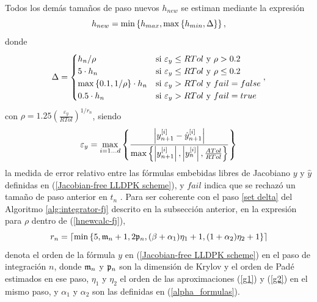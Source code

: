 Todos los demás tamaños de paso nuevos $h_{new}$ se estiman mediante la expresión
\begin{equation}
    h_{new} = \min\left\{ h_{max},\max\left\{ h_{min},\Delta \right\} \right\}, \label{hnewcalc-fj}
\end{equation}
donde
\begin{equation*}
    \Delta = \begin{cases}
        h_n/\rho & \text{si } \varepsilon_y\leq RTol \text{ y } \rho>0\mathord{.}2\\
        5\cdot h_n & \text{si } \varepsilon_y\leq RTol \text{ y } \rho\leq 0\mathord{.}2\\
        \max\left\{ 0\mathord{.}1,1/\rho \right\}\cdot h_n & \text{si } \varepsilon_y > RTol \text{ y } fail=false\\
        0\mathord{.}5\cdot h_n & \text{si } \varepsilon_y > RTol \text{ y } fail=true
        \end{cases},
\end{equation*}
con  $\rho = 1\mathord{.}25 \left( \frac{\varepsilon_y}{RTol} \right)^{1/r_n}$, siendo
\begin{equation}\label{epsilon_y-fj}
	\varepsilon_y =  \max_{i=1\ldots d}\left\{ \frac{\left\lvert y^{[i]}_{n+1}-\hat{y}^{[i]}_{n+1} \right\rvert}
	{\max\left\{ \left\lvert y^{[i]}_{n+1}  \right\rvert,\left\lvert y^{[i]}_{n}\right\rvert,\frac{ATol}{RTol} \right\}} \right\}
\end{equation}
la medida de error relativo entre las fórmulas embebidas libres de Jacobiano $y$ y $\hat y$ definidas en (\ref{Jacobian-free LLDPK scheme}), y $fail$ indica que se rechazó un tamaño de paso anterior en $t_n$ . Para ser coherente con el paso \ref{set delta} del Algoritmo \ref{alg:integrator-fj} descrito en la subsección anterior, en la expresión para $\rho$ dentro de (\ref{hnewcalc-fj}),
\[r_n=\lceil\mathrm{min}\left\{5,\mathfrak{m}_{n}+1,2\mathfrak{p}_{n},(\beta+\alpha_1)\eta_1+1,(1+\alpha_2)\eta_2+1 \right\}\rceil\]
denota el orden de la fórmula $y$ en (\ref{Jacobian-free LLDPK scheme}) en el paso de integración $n$, donde $\mathfrak{m}_{n}$ y $\mathfrak{p}_{n}$ son la dimensión de Krylov y el orden de Padé estimados en ese paso, $\eta_1$ y $\eta_2$ el orden de las aproximaciones (\ref{g1}) y (\ref{g2}) en el mismo paso, y
$\alpha_1$ y $\alpha_2$ son las definidas en (\ref{alpha_formulas}).

